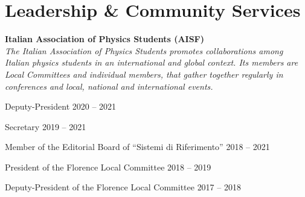 \newcommand{\community}[1]
  {\normalsize \color{hlcolor-0} \textbf{#1}}


\section*{Leadership \& Community Services}
\begin{cvcontent}
  \community{Italian Association of Physics Students (AISF)} \hfill
  \\
  \emph{\small The Italian Association of Physics Students promotes collaborations among Italian physics students in an international and global context. Its members are Local Committees and individual members, that gather together regularly in conferences and local, national and international events.}\\ [1mm]
  \begin{itemize*}[label=\textcolor{iconcolor}{\textbullet}]
    \item Deputy-President \hfill {\color{hlcolor-2} 2020 -- 2021}\\ [0.5mm]
    \item Secretary \hfill {\color{hlcolor-2} 2019 -- 2021}\\ [0.5mm]
    \item Member of the Editorial Board of ``Sistemi di Riferimento'' \hfill {\color{hlcolor-2} 2018 -- 2021}\\ [0.5mm]
    \item President of the Florence Local Committee \hfill {\color{hlcolor-2} 2018 -- 2019}\\ [0.5mm]
    \item Deputy-President of the Florence Local Committee \hfill {\color{hlcolor-2} 2017 -- 2018}
  \end{itemize*}
\end{cvcontent}
